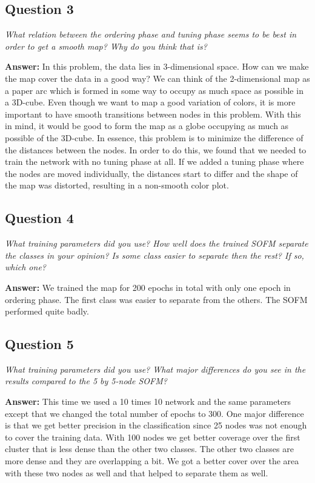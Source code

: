\documentclass[a4paper]{article}
\begin{document}
\subsection*{Question 3}
\emph{What relation between the ordering phase and tuning phase seems to be best in order to get a smooth map? Why do you think that is?}

\textbf{Answer:} 
In this problem, the data lies in 3-dimensional space. How can we make the map cover the data in a good way? We can think of the 2-dimensional map as a paper arc which is formed  in some way to occupy as much space as possible in a 3D-cube. Even though we want to map a good variation of colors, it is more important to have smooth transitions between nodes in this problem. With this in mind, it would be good to form the map as a globe occupying as much as possible of the 3D-cube. In essence, this problem is to minimize the difference of the distances between the nodes. In order to do this, we found that we needed to train the network with no tuning phase at all. If we added a tuning phase where the nodes are moved individually, the distances start to differ and the shape of the map was distorted, resulting in a non-smooth color plot.

\subsection*{Question 4}
\emph{What training parameters did you use? How well does the trained
SOFM separate the classes in your opinion? Is some class easier to separate then the rest? If so, which one?}

\textbf{Answer:} We trained the map for 200 epochs in total with only one epoch in ordering phase. The first class was easier to separate from the others. The SOFM performed quite badly. 

\subsection*{Question 5}
\emph{What training parameters did you use? What  major differences
do you see in the results compared to the 5 by 5-node SOFM?}

\textbf{Answer:} This time we used a 10 times 10 network and the same parameters except that we changed the total number of epochs to 300. One major difference is that we get better precision in the classification since 25 nodes was not enough to cover the training data. With 100 nodes we get better coverage over the first cluster that is less dense than the other two classes. The other two classes are more dense and they are overlapping a bit. We got a better cover over the area with these two nodes as well and that helped to separate them as well.
\end{document}
